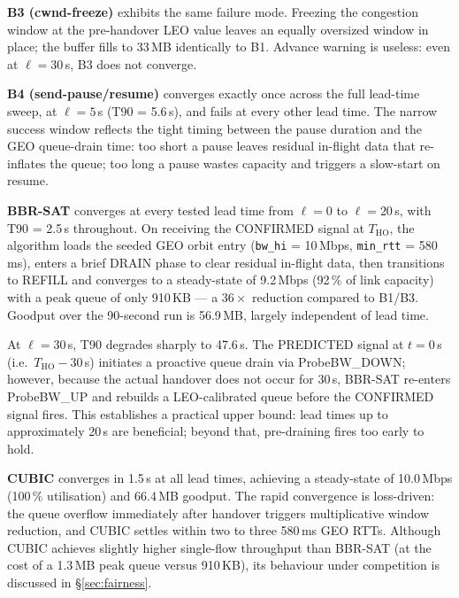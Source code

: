 \documentclass[conference]{IEEEtran}
\begin{document}
\textbf{B3 (cwnd-freeze)} exhibits the same failure mode.
Freezing the congestion window at the pre-handover LEO value leaves an
equally oversized window in place; the buffer fills to 33\,MB
identically to B1.
Advance warning is useless: even at $\ell = 30$\,s, B3 does not converge.

\textbf{B4 (send-pause/resume)} converges exactly once across the full
lead-time sweep, at $\ell = 5$\,s (T90 = 5.6\,s), and fails at every
other lead time.
The narrow success window reflects the tight timing between the pause
duration and the GEO queue-drain time: too short a pause leaves residual
in-flight data that re-inflates the queue; too long a pause wastes capacity
and triggers a slow-start on resume.

\textbf{BBR-SAT} converges at every tested lead time from $\ell = 0$ to
$\ell = 20$\,s, with T90 = 2.5\,s throughout.
On receiving the CONFIRMED signal at $T_\mathrm{HO}$, the algorithm
loads the seeded GEO orbit entry (\texttt{bw\_hi} = 10\,Mbps, \texttt{min\_rtt}
= 580\,ms), enters a brief DRAIN phase to clear residual in-flight data,
then transitions to REFILL and converges to a steady-state of 9.2\,Mbps
(92\,\% of link capacity) with a peak queue of only 910\,KB --- a
$36\times$ reduction compared to B1/B3.
Goodput over the 90-second run is 56.9\,MB, largely independent of lead time.

At $\ell = 30$\,s, T90 degrades sharply to 47.6\,s.
The PREDICTED signal at $t = 0$\,s (i.e.\ $T_\mathrm{HO} - 30$\,s)
initiates a proactive queue drain via ProbeBW\_DOWN; however, because
the actual handover does not occur for 30\,s, BBR-SAT re-enters
ProbeBW\_UP and rebuilds a LEO-calibrated queue before the CONFIRMED
signal fires.
This establishes a practical upper bound: lead times up to approximately
20\,s are beneficial; beyond that, pre-draining fires too early to hold.

\textbf{CUBIC} converges in 1.5\,s at all lead times, achieving a
steady-state of 10.0\,Mbps (100\,\% utilisation) and 66.4\,MB goodput.
The rapid convergence is loss-driven: the queue overflow immediately after
handover triggers multiplicative window reduction, and CUBIC settles within
two to three 580\,ms GEO RTTs.
Although CUBIC achieves slightly higher single-flow throughput than
BBR-SAT (at the cost of a 1.3\,MB peak queue versus 910\,KB), its
behaviour under competition is discussed in \S\ref{sec:fairness}.
\end{document}

